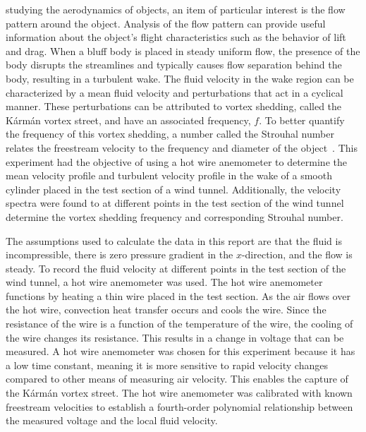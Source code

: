 \documentclass[journal,letterpaper]{IEEEtran}
\begin{document}
 studying the aerodynamics of objects, an item of particular interest is the flow pattern around the object.
Analysis of the flow pattern can provide useful information about the object's flight characteristics such as the behavior of lift and drag.
When a bluff body is placed in steady uniform flow, the presence of the body disrupts the streamlines and typically causes flow separation behind the body, resulting in a turbulent wake.
The fluid velocity in the wake region can be characterized by a mean fluid velocity and perturbations that act in a cyclical manner.
These perturbations can be attributed to vortex shedding, called the Kármán vortex street, and have an associated frequency, $f$. To better quantify the frequency of this vortex shedding, a number called the Strouhal number relates the freestream velocity to the frequency and diameter of the object~\cite{Strouhal}.
This experiment had the objective of using a hot wire anemometer to determine the mean velocity profile and turbulent velocity profile in the wake of a smooth cylinder placed in the test section of a wind tunnel.
Additionally, the velocity spectra were found to at different points in the test section of the wind tunnel determine the vortex shedding frequency and corresponding Strouhal number.

The assumptions used to calculate the data in this report are that the fluid is incompressible, there is zero pressure gradient in the $x$-direction, and the flow is steady.
To record the fluid velocity at different points in the test section of the wind tunnel, a hot wire anemometer was used.
The hot wire anemometer functions by heating a thin wire placed in the test section.
As the air flows over the hot wire, convection heat transfer occurs and cools the wire.
Since the resistance of the wire is a function of the temperature of the wire, the cooling of the wire changes its resistance.
This results in a change in voltage that can be measured.
A hot wire anemometer was chosen for this experiment because it has a low time constant, meaning it is more sensitive to rapid velocity changes compared to other means of measuring air velocity.
This enables the capture of the Kármán vortex street.
The hot wire anemometer was calibrated with known freestream velocities to establish a fourth-order polynomial relationship between the measured voltage and the local fluid velocity.
\end{document}
